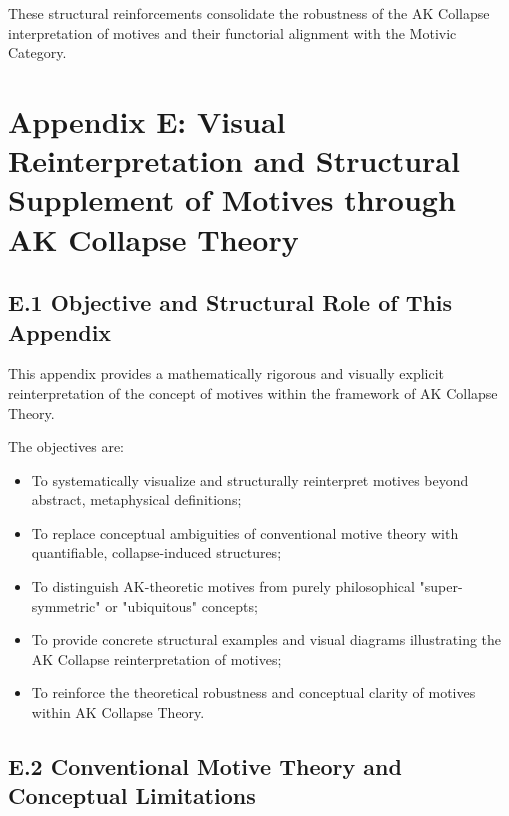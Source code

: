 \documentclass[11pt]{article}
\begin{document}
These structural reinforcements consolidate the robustness of the AK Collapse interpretation of motives and their functorial alignment with the Motivic Category.

\FloatBarrier




\section*{Appendix E: Visual Reinterpretation and Structural Supplement of Motives through AK Collapse Theory}

\subsection*{E.1 Objective and Structural Role of This Appendix}

This appendix provides a mathematically rigorous and visually explicit reinterpretation of the concept of motives within the framework of AK Collapse Theory.

The objectives are:

\begin{itemize}
    \item To systematically visualize and structurally reinterpret motives beyond abstract, metaphysical definitions;
    \item To replace conceptual ambiguities of conventional motive theory with quantifiable, collapse-induced structures;
    \item To distinguish AK-theoretic motives from purely philosophical "super-symmetric" or "ubiquitous" concepts;
    \item To provide concrete structural examples and visual diagrams illustrating the AK Collapse reinterpretation of motives;
    \item To reinforce the theoretical robustness and conceptual clarity of motives within AK Collapse Theory.
\end{itemize}

\subsection*{E.2 Conventional Motive Theory and Conceptual Limitations}
\end{document}
